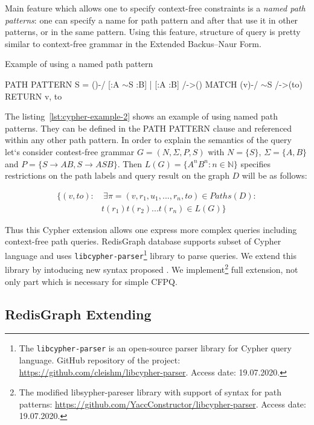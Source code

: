 Main feature which allows one to specify context-free constraints is a \textit{named path patterns}: one can specify a name for path pattern and after that use it in other patterns, or in the same pattern. Using this feature, structure of query is pretty similar to context-free grammar in the Extended Backus–Naur Form.

\begin{algorithm}
\begin{algorithmic}[1]
\caption{Example of using a named path pattern}
\label{lst:cypher-example-2}
\State PATH PATTERN S = ()-/ [:A $\sim$S :B] | [:A :B] /->()
\State MATCH (v)-/ $\sim$S /->(to)
\State RETURN v, to
\end{algorithmic}
\end{algorithm}

The listing~\ref{lst:cypher-example-2} shows an example of using named path patterns. They can be defined in the PATH PATTERN clause and referenced within any other path pattern. In order to explain the semantics of the query let`s consider contest-free grammar $G=(N, \Sigma, P, S)$ with $N=\{S\}$, $\Sigma=\{A,B\}$ and $P=\{S \xrightarrow{} A B, S \xrightarrow{} ASB \}$. Then $L(G)=\{A^nB^n: n \in \mathbb{N}\}$ specifies restrictions on the path labels and query result on the graph $D$ will be as follows:

\begin{align*}
\{ (v, to): &~\exists \pi=(v,r_1,u_1,...,r_n,to) \in Paths(D): \\
            &t(r_1)t(r_2)...t(r_n) \in L(G) \}
\end{align*}

Thus this Cypher extension allows one express more complex queries including context-free path queries.
RedisGraph database supports subset of Cypher language and uses \texttt{libcypher-parser}\footnote{The \texttt{libcypher-parser} is an open-source parser library for Cypher query language. GitHub repository of the project: \url{https://github.com/cleishm/libcypher-parser}. Access date: 19.07.2020.} library to parse queries.
We extend this library by intoducing new syntax proposed . We implement\footnote{The modified libsypher-pareser library with support of syntax for path patterns: \url{https://github.com/YaccConstructor/libcypher-parser}. Access date: 19.07.2020.} full extension, not only part which is necessary for simple CFPQ. 

\subsection{RedisGraph Extending}

